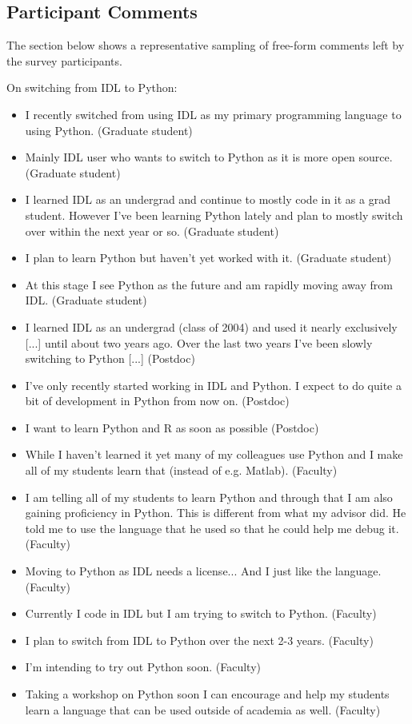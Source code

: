 \begin{appendix}
\section{Participant Comments}

The section below shows a representative sampling of free-form comments left by the survey participants. 

On switching from IDL to Python:

\begin{itemize}
\item{I recently switched from using IDL as my primary programming language to using Python. (Graduate student)}
\item{Mainly IDL user who wants to switch to Python as it is more open source. (Graduate student)}
\item{I learned IDL as an undergrad and continue to mostly code in it as a grad student. However I've been learning Python lately and plan to mostly switch over within the next year or so. (Graduate student)}
\item{I plan to learn Python but haven't yet worked with it. (Graduate student)}
\item{At this stage I see Python as the future and am rapidly moving away from IDL. (Graduate student)}
\item{I learned IDL as an undergrad (class of 2004) and used it nearly exclusively [...] until about two years ago. Over the last two years I've been slowly switching to Python [...]
(Postdoc)}
\item{I've only recently started working in IDL and Python.  I expect to do quite a bit of development in Python from now on. (Postdoc)}
\item{I want to learn Python and R as soon as possible (Postdoc)}
\item{While I haven't learned it yet many of my colleagues use Python and I make all of my students learn that (instead of e.g. Matlab). (Faculty)}
\item{I am telling all of my students to learn Python and through that I am also gaining proficiency in Python.  This is different from what my advisor did.  He told me to use the language that he used so that he could help me debug it. (Faculty)}
\item{Moving to Python as IDL needs a license... And I just like the language. (Faculty)}
\item{Currently I code in IDL but I am trying to switch to Python. (Faculty)}
\item{I plan to switch from IDL to Python over the next 2-3 years. (Faculty)}
\item{I'm intending to try out Python soon. (Faculty)}
\item{Taking a workshop on Python soon I can encourage and help my students learn a language that can be used outside of academia as well. (Faculty)}
\end{itemize}


\end{appendix}
